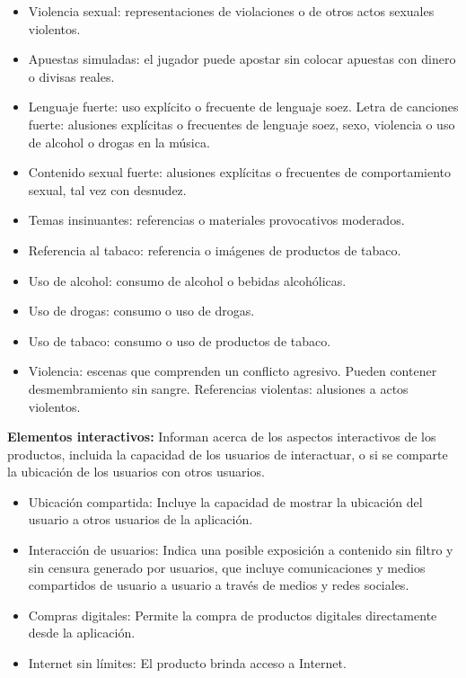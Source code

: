 \begin{itemize}
				\item Violencia sexual: representaciones de violaciones o de otros actos sexuales violentos.
				\item Apuestas simuladas: el jugador puede apostar sin colocar apuestas con dinero o divisas reales.
				\item Lenguaje fuerte: uso explícito o frecuente de lenguaje soez.
				Letra de canciones fuerte: alusiones explícitas o frecuentes de lenguaje soez, sexo, violencia o uso de alcohol o drogas en la música.
				\item Contenido sexual fuerte: alusiones explícitas o frecuentes de comportamiento sexual, tal vez con desnudez.
				\item Temas insinuantes: referencias o materiales provocativos moderados.
				\item Referencia al tabaco: referencia o imágenes de productos de tabaco.
				\item Uso de alcohol: consumo de alcohol o bebidas alcohólicas.
				\item Uso de drogas: consumo o uso de drogas.
				\item Uso de tabaco: consumo o uso de productos de tabaco.
				\item Violencia: escenas que comprenden un conflicto agresivo. Pueden contener desmembramiento sin sangre.
				Referencias violentas: alusiones a actos violentos.
			\end{itemize}
			
			\textbf{Elementos interactivos: } 
			Informan acerca de los aspectos interactivos de los productos, incluida la capacidad de los usuarios de interactuar, o si se comparte la ubicación de los usuarios con otros usuarios.
			\\[1pt]
			
			\begin{itemize}
			
			\item Ubicación compartida: Incluye la capacidad de mostrar la ubicación del usuario a otros usuarios de la aplicación.
			\item Interacción de usuarios: Indica una posible exposición a contenido sin filtro y sin censura generado por usuarios, que incluye comunicaciones y medios compartidos de usuario a usuario a través de medios y redes sociales.
			\item Compras digitales: Permite la compra de productos digitales directamente desde la aplicación.
			\item Internet sin límites: El producto brinda acceso a Internet.
		\end{itemize}
		

